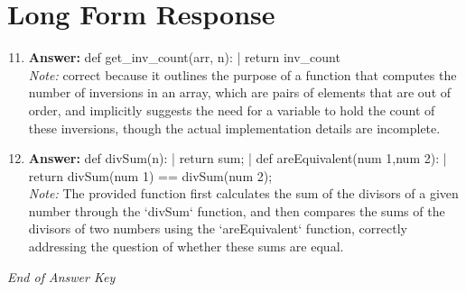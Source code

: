\documentclass[12pt]{article}
\begin{document}
\section*{Long Form Response}
\begin{enumerate}[label=\arabic*.]
\setcounter{enumi}{10}
\item \textbf{Answer:} def get\_inv\_count(arr, n): | return inv\_count
\\ \textit{Note:} correct because it outlines the purpose of a function that computes the number of inversions in an array, which are pairs of elements that are out of order, and implicitly suggests the need for a variable to hold the count of these inversions, though the actual implementation details are incomplete.
\item \textbf{Answer:} def divSum(n): | return sum; | def areEquivalent(num 1,num 2): | return divSum(num 1) == divSum(num 2);
\\ \textit{Note:} The provided function first calculates the sum of the divisors of a given number through the `divSum` function, and then compares the sums of the divisors of two numbers using the `areEquivalent` function, correctly addressing the question of whether these sums are equal.
\end{enumerate}

\vfill
\noindent\textit{End of Answer Key}
\end{document}
